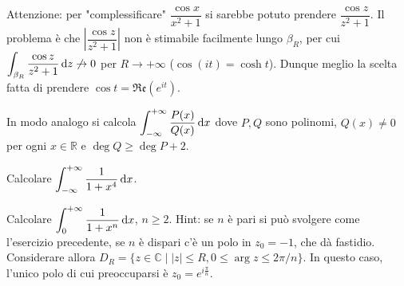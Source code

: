 Attenzione: per "complessificare" $\dfrac{\cos{x}}{x^2+1}$ si sarebbe potuto prendere $\dfrac{\cos{z}}{z^2+1}$.
Il problema è che $\left| \dfrac{\cos{z}}{z^2+1}\right|$ non è stimabile facilmente lungo $\beta_R$, per cui $\displaystyle \int_{\beta_R} \frac{\cos{z}}{z^2+1}\mathop{}\!\mathrm{d} z \not\rightarrow 0$ per $R \longrightarrow +\infty$ ($\cos(it)=\cosh{t}$). Dunque meglio la scelta fatta di prendere $\cos{t}=\mathfrak{Re}(e^{it})$. \marginpar\warningsign

In modo analogo si calcola $\displaystyle \int_{-\infty}^{+\infty} \frac{P(x)}{Q(x)}\mathop{}\!\mathrm{d} x$ dove $P, Q$ sono polinomi, $Q(x) \not=0$ per ogni $x \in \mathbb{R}$ e $\deg{Q} \ge \deg{P}+2$.

\begin{exc}
  Calcolare $\displaystyle \int_{-\infty}^{+\infty} \frac{1}{1+x^4}\mathop{}\!\mathrm{d} x$.
\end{exc}

\begin{exc}
  Calcolare $\displaystyle \int_0^{+\infty} \frac{1}{1+x^n} \mathop{}\!\mathrm{d} x$, $n \ge 2$. Hint: se $n$ è pari si può svolgere come l'esercizio precedente, se $n$ è dispari c'è un polo in $z_0=-1$, che dà fastidio. Considerare allora $D_R=\{z \in \mathbb{C} \mid |z| \le R, 0 \le \arg{z} \le 2\pi/n\}$. In questo caso, l'unico polo di cui preoccuparsi è $z_0=e^{i\frac{\pi}{n}}$.
\end{exc}

